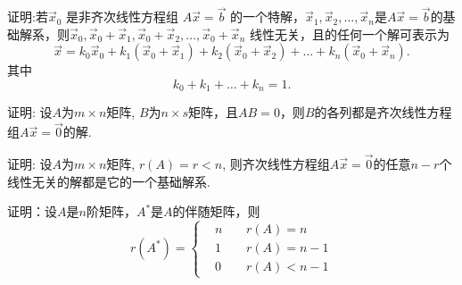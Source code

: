 \begin{ex}\label{5.25}
证明:若$\vec{x}_0$ 是非齐次线性方程组 $A\vec{x}=\vec{b}$ 的一个特解，$\vec{x}_1,\vec{x}_2,…,\vec{x}_n$是$A\vec{x}=\vec{b}$的基础解系，则$\vec{x}_0,\vec{x}_0+\vec{x}_1,\vec{x}_0+\vec{x}_2,…,\vec{x}_0+\vec{x}_n$ 线性无关，且的任何一个解可表示为
$$\vec{x}=k_0 \vec{x}_0+k_1 (\vec{x}_0+\vec{x}_1 )+k_2 (\vec{x}_0+\vec{x}_2 )+\dots+k_n (\vec{x}_0+\vec{x}_n ).$$
其中$$k_0+k_1+\dots+k_n=1.$$
\end{ex}

\begin{ex}\label{5.26}
证明: 设$A$为$m\times n$矩阵, $B$为$n\times s$矩阵，且$AB=0$，则$B$的各列都是齐次线性方程组$A\vec{x}=\vec{0}$的解.
\end{ex}

\begin{ex}\label{5.27}
证明: 设$A$为$m\times n$矩阵, $r(A)=r<n$, 则齐次线性方程组$A\vec{x}=\vec{0}$的任意$n-r$个线性无关的解都是它的一个基础解系.
\end{ex}

\begin{ex}\label{5.28}
证明：设$A$是$n$阶矩阵，$A^{*}$是$A$的伴随矩阵，则
\begin{displaymath}
r(A^{*} )=\left\{\begin{aligned}&n\ \ \ \ \ &r(A)=n\\ &1 &r(A)=n-1\\ &0 &r(A)<n-1\end{aligned}\right.\end{displaymath}
\end{ex}

